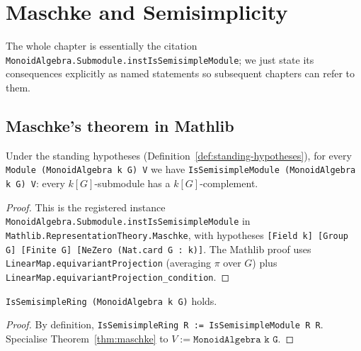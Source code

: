 \chapter{Maschke and Semisimplicity}
\label{chap:maschke}

The whole chapter is essentially the citation
\texttt{MonoidAlgebra.Submodule.instIsSemisimpleModule}; we just state its
consequences explicitly as named statements so subsequent chapters can refer
to them.

\section{Maschke's theorem in Mathlib}

\begin{theorem}
  \label{thm:maschke}
  \mathlibok
  \leanok
  Under the standing hypotheses (Definition~\ref{def:standing-hypotheses}),
  for every \texttt{Module (MonoidAlgebra k G) V} we have
  \texttt{IsSemisimpleModule (MonoidAlgebra k G) V}: every $k[G]$-submodule
  has a $k[G]$-complement.
\end{theorem}

\begin{proof}
  \leanok
  This is the registered instance
  \texttt{MonoidAlgebra.Submodule.instIsSemisimpleModule} in
  \texttt{Mathlib.RepresentationTheory.Maschke}, with hypotheses
  \texttt{[Field k] [Group G] [Finite G] [NeZero (Nat.card G : k)]}.
  The Mathlib proof uses
  \texttt{LinearMap.equivariantProjection} (averaging $\pi$ over $G$) plus
  \texttt{LinearMap.equivariantProjection\_condition}.
\end{proof}

\begin{corollary}
  \label{cor:kG-semisimple-ring}
  \mathlibok
  \leanok
  \texttt{IsSemisimpleRing (MonoidAlgebra k G)} holds.
\end{corollary}

\begin{proof}
  \leanok
  By definition, \texttt{IsSemisimpleRing R := IsSemisimpleModule R R}.
  Specialise Theorem~\ref{thm:maschke} to $V := \texttt{MonoidAlgebra k G}$.
\end{proof}


